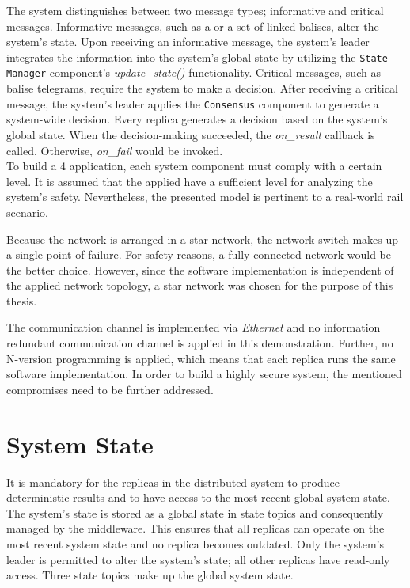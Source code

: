 \noindent
The system distinguishes between two message types; informative and critical messages.
Informative messages, such as a  or a set of linked balises, alter the system's state.
Upon receiving an informative message, the system's leader integrates the information into the system's global state by utilizing the \texttt{State Manager} component's \textit{update\_state()} functionality.
Critical messages, such as balise telegrams, require the system to make a decision.
After receiving a critical message, the system's leader applies the \texttt{Consensus} component to generate a system-wide decision.
Every replica generates a decision based on the system's global state.
When the decision-making succeeded, the \textit{on\_result} callback is called.
Otherwise, \textit{on\_fail} would be invoked.
\\

\noindent
To build a  4 application, each system component must comply with a certain  level.
It is assumed that the applied  have a sufficient  level for analyzing the system's safety.
Nevertheless, the presented model is pertinent to a real-world rail scenario.

Because the network is arranged in a star network, the network switch makes up a single point of failure.
For safety reasons, a fully connected network would be the better choice.
However, since the software implementation is independent of the applied network topology, a star network was chosen for the purpose of this thesis.

The communication channel is implemented via \textit{Ethernet} and no information redundant communication channel is applied in this demonstration.
Further, no N-version programming is applied, which means that each replica runs the same software implementation.
In order to build a highly secure system, the mentioned compromises need to be further addressed.

\section{System State}
\label{sec:stateManager}
It is mandatory for the replicas in the distributed system to produce deterministic results and to have access to the most recent global system state.
The system's state is stored as a global state in  state topics and consequently managed by the middleware.
This ensures that all replicas can operate on the most recent system state and no replica becomes outdated.
Only the system's leader is permitted to alter the system's state; all other replicas have read-only access.
Three  state topics make up the global system state.
\\


